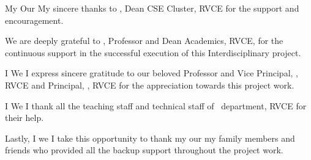 \ifPG My \else \ifStuNameBUsed Our \else My \fi\fi sincere thanks to \textbf{\printDC}, Dean CSE Cluster, RVCE for the support and encouragement.\\ \par


\ifIDP
We are deeply grateful to \textbf{\printDA}, Professor and Dean Academics, RVCE, for the continuous support in the successful execution of this Interdisciplinary project.
\\ \par
\fi
\ifPG I \else \ifStuNameBUsed We \else I \fi\fi express sincere gratitude to our beloved Professor and Vice Principal, \textbf{\printVicePrincipal}, RVCE and Principal, \textbf{\printPrincipal}, RVCE for the appreciation towards this project work.\\ \par


\ifIDP \else\ifPG I \else\ifStuNameBUsed We \else I \fi\fi thank all the teaching staff and technical staff of \ifIDP \printGuideDeptAInLF\else\printDepartmentLF\fi\, department, RVCE for their help.\\ \par \fi


Lastly, \ifPG I \else\ifStuNameBUsed we \else I \fi\fi take this opportunity to thank \ifPG my \else\ifStuNameBUsed our \else my \fi\fi family members and friends who provided all the backup support throughout the project work.\\ \par